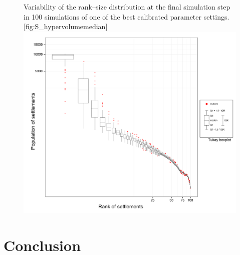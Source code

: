 \begin{figure}[!htbp]
\begin{sidecaption}{Variability of the rank–size distribution at the final simulation step in 100 simulations of one of the best calibrated parameter settings.}[fig:S_hypervolumemedian]
  \centering
 \includegraphics[width=1.0\linewidth]{varRTrouge.png}
  \end{sidecaption}
\end{figure}

\section{Conclusion}
\label{sec:conlusion}

